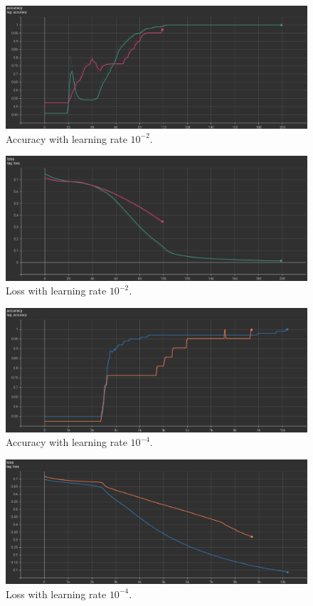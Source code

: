 	\begin{figure}[H]
		\centering
		\includegraphics[scale=0.5]{img/adam_acc.png}
		\caption{Accuracy with learning rate $10^{-2}$.}
		\label{lr-acc-1e-2}
	\end{figure}
	\begin{figure}[H]
		\centering
		\includegraphics[scale=0.5]{img/adam_loss.png}
		\caption{Loss with learning rate $10^{-2}$.}
		\label{lr-loss-1e-2}
	\end{figure}

	\begin{figure}[H]
		\centering
		\includegraphics[scale=0.5]{img/1e-4_acc.png}
		\caption{Accuracy with learning rate $10^{-4}$.}
		\label{lr-acc-1e-4}
	\end{figure}
	\begin{figure}[H]
		\centering
		\includegraphics[scale=0.5]{img/1e-4_loss.png}
		\caption{Loss with learning rate $10^{-4}$.}
		\label{lr-loss-1e-4}
	\end{figure}

